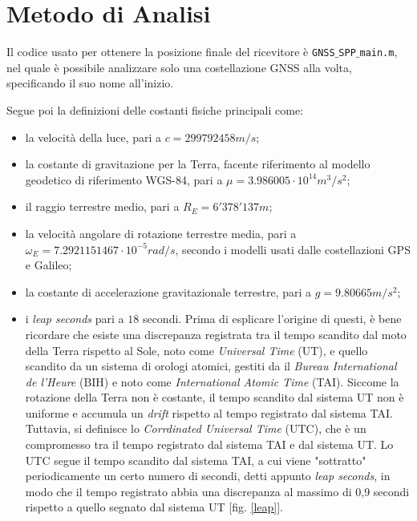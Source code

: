 \documentclass[a4paper,11pt,twoside]{book}
\begin{document}
	\section{Metodo di Analisi}
	
	Il codice usato per ottenere la posizione finale del ricevitore è \texttt{GNSS$\_$SPP$\_$main.m}, nel quale è possibile analizzare solo una costellazione GNSS alla volta, specificando il suo nome all'inizio.
	
	Segue poi la definizioni delle costanti fisiche principali come:
	
	\begin{itemize}[-]
		\item la velocità della luce, pari a $c = 299792458 m/s$;
		
		\item la costante di gravitazione per la Terra, facente riferimento al modello geodetico di riferimento WGS-84, pari a $\mu = 3.986005 \cdot 10 ^{14}m^3/s^2$;
		
		\item il raggio terrestre medio, pari a $R_E = 6'378'137m$;
		
		\item la velocità angolare di rotazione terrestre media, pari a $\omega_E = 7.2921151467 \cdot 10^{-5} rad/s$, secondo i modelli usati dalle costellazioni GPS e Galileo;
		
		\item la costante di accelerazione gravitazionale terrestre, pari a $g = 9.80665m/s^2$;
		
		\item i \textit{leap seconds} pari a $18$ secondi. Prima di esplicare l'origine di questi, è bene  ricordare che esiste una discrepanza registrata tra il tempo scandito dal moto della Terra rispetto al Sole, noto come \textit{Universal Time} (UT), e quello scandito da un sistema di orologi atomici, gestiti da il \textit{Bureau International de l'Heure} (BIH) e noto come \textit{International Atomic Time} (TAI). Siccome la rotazione della Terra non è costante, il tempo scandito dal sistema UT non è uniforme e accumula un \textit{drift} rispetto al tempo registrato dal sistema TAI. Tuttavia, si definisce lo \textit{Corrdinated Universal Time} (UTC), che è un compromesso tra il tempo registrato dal sistema TAI e dal sistema UT. Lo UTC segue il tempo scandito dal sistema TAI, a cui viene "sottratto" periodicamente un certo numero di secondi, detti appunto \textit{leap seconds}, in modo che il tempo registrato abbia una discrepanza al massimo di 0,9 secondi rispetto a quello segnato dal sistema UT [fig. \ref{leap}].
		

\end{itemize}
\end{document}
